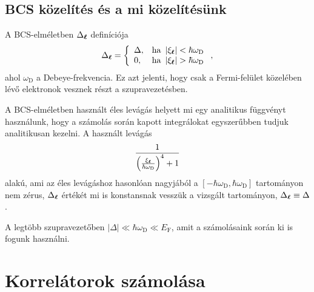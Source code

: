 \documentclass[a4paper,12pt,titlepage]{article}
\newcommand{\LL}{{\vb*{\ell}}}
\begin{document}
\subsection{BCS közelítés és a mi közelítésünk}

A BCS-elméletben $\Delta_\LL$ definíciója
\begin{equation}
	\Delta_\LL = \left\{ \begin{array}{ll} \Delta, & \text{ha } \left| \xi_\LL \right| < \hbar \omega_\text{D} \\ 0, & \text{ha } \left| \xi_\LL \right| > \hbar \omega_\text{D} \end{array} \right. ,
\end{equation}
ahol $\omega_\text{D}$ a Debeye-frekvencia.  Ez azt jelenti, hogy csak a Fermi-felület közelében lévő elektronok vesznek részt a szupravezetésben.

A BCS-elméletben használt éles levágás helyett mi egy analitikus függvényt használunk, hogy a számolás során kapott integrálokat egyszerűbben tudjuk analitikusan kezelni.  A használt levágás
$$ \frac{1}{\left( \frac{\xi_\LL}{\hbar \omega_\text{D}} \right)^4 + 1} $$
alakú, ami az éles levágáshoz hasonlóan nagyjából a $\left[ -\hbar \omega_\text{D}, \hbar \omega_\text{D} \right]$ tartományon nem zérus, $\Delta_\LL$ értékét mi is konstansnak vesszük a vizsgált tartományon, $\Delta_\LL \equiv \Delta$.

A legtöbb szupravezetőben $\left|\Delta\right| \ll \hbar \omega_\text{D} \ll E_\text{F}$, amit a számolásaink során ki is fogunk használni.



\section{Korrelátorok számolása}
\end{document}
